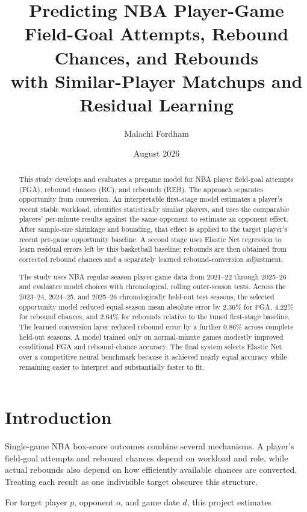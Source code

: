 \documentclass[11pt]{article}
\title{Predicting NBA Player-Game Field-Goal Attempts, Rebound Chances, and Rebounds\\
with Similar-Player Matchups and Residual Learning}
\author{Malachi Fordham}
\date{August 2026}
\begin{document}
\maketitle

\begin{abstract}
This study develops and evaluates a pregame model for NBA player field-goal
attempts (FGA), rebound chances (RC), and rebounds (REB). The approach separates
opportunity from conversion. An interpretable first-stage model estimates a player's recent stable workload,
identifies statistically similar players, and uses the comparable players'
per-minute results against the same opponent to estimate an opponent effect.
After sample-size shrinkage and bounding, that effect is applied to the
target player's recent per-game opportunity baseline. A second
stage uses Elastic Net regression to learn residual errors left by this
basketball baseline; rebounds are then obtained from corrected rebound chances
and a separately learned rebound-conversion adjustment.

The study uses NBA regular-season player-game data from 2021--22 through
2025--26 and evaluates model choices with chronological, rolling outer-season
tests. Across the 2023--24, 2024--25, and 2025--26 chronologically held-out test seasons, the selected
opportunity model reduced equal-season mean absolute error by 2.36\% for FGA,
4.22\% for rebound chances, and 2.64\% for rebounds relative to the tuned
first-stage baseline. The learned conversion layer reduced rebound error by a
further 0.86\% across complete held-out seasons. A model trained only on
normal-minute games modestly improved conditional FGA and rebound-chance
accuracy. The final system selects Elastic Net over a competitive neural benchmark
because it achieved nearly equal accuracy while remaining easier to interpret
and substantially faster to fit.
\end{abstract}

\section{Introduction}

Single-game NBA box-score outcomes combine several mechanisms. A player's
field-goal attempts and rebound chances depend on workload and role, while
actual rebounds also depend on how efficiently available chances are
converted. Treating each result as one indivisible target obscures this
structure.

For target player $p$, opponent $o$, and game date $d$, this project estimates
\end{document}
